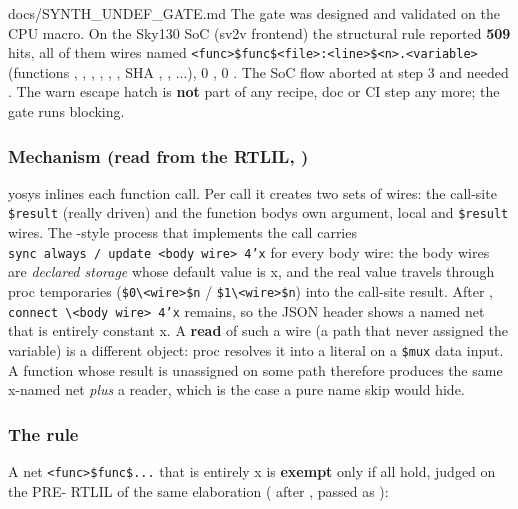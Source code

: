 \begin{relocated}{docs/SYNTH_UNDEF_GATE.md}
The gate was designed and validated on the CPU macro. On the Sky130 SoC
(sv2v frontend) the structural  rule reported
\textbf{509} hits, all of them wires named
\texttt{<func>\$func\$<file>:\allowbreak{}<line>\$<n>.\allowbreak{}<variable>}
(functions , , , ,
, , SHA ,
, ...), 0 , 0
. The SoC flow aborted at step 3 and needed
. The warn escape hatch is \textbf{not} part
of any recipe, doc or CI step any more; the gate runs blocking.

\subsubsection{\texorpdfstring{Mechanism (read from the RTLIL,
)}{Mechanism (read from the RTLIL, )}}\label{tm:flow:synth-undef-gate:mechanism-read-from-the-rtlil-tbtestsfixturessynth-undeffunctemp}

yosys inlines each function call. Per call it creates two sets of wires:
the call-site \texttt{\$result} (really driven) and the function
body\textquotesingle s own argument, local and \texttt{\$result} wires.
The -style process that implements the call carries
\texttt{sync\ always\ /\allowbreak{}\ update\ <body\ wire>\ 4'x} for
every body wire: the body wires are \emph{declared storage} whose
default value is x, and the real value travels through proc temporaries
(\texttt{\$0\textbackslash{}<wire>\$n} /
\texttt{\$1\textbackslash{}<wire>\$n}) into the call-site result. After
, \texttt{connect\ \textbackslash{}<body\ wire>\ 4'x}
remains, so the JSON header shows a named net that is entirely constant
x. A \textbf{read} of such a wire (a path that never assigned the
variable) is a different object: proc resolves it into a literal
 on a \texttt{\$mux} data input. A function whose result is
unassigned on some path therefore produces the same x-named net
\emph{plus} a reader, which is the case a pure name skip would hide.

\subsubsection{\texorpdfstring{The rule
}{The rule }}\label{tm:flow:synth-undef-gate:the-rule-func-temp-dead-init}

A net \texttt{<func>\$func\$.\allowbreak{}.\allowbreak{}.\allowbreak{}}
that is entirely x is \textbf{exempt} only if all hold, judged on the
PRE- RTLIL of the same elaboration ( after
, passed as ):


\end{relocated}
